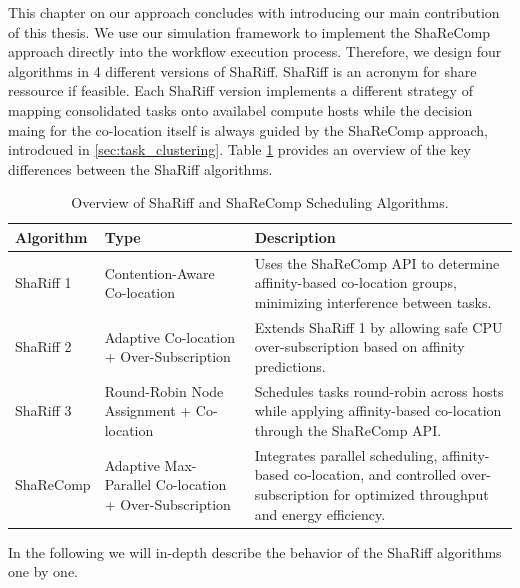 \label{sec:co-location_strategies}

This chapter on our approach concludes with introducing our main contribution of this thesis. We use our simulation framework to implement the ShaReComp approach directly into the workflow execution process. Therefore, we design four algorithms in 4 different versions of ShaRiff. ShaRiff is an acronym for share ressource if feasible. Each ShaRiff version implements a different strategy of mapping consolidated tasks onto availabel compute hosts while the decision maing for the co-location itself is always guided by the ShaReComp approach, introdcued in \ref{sec:task_clustering}.
Table \ref{tab:shariff_overview} provides an overview of the key differences between the ShaRiff algorithms.

\begin{table}[H]
    \centering
    \footnotesize  %
    \begin{tabularx}{\textwidth}{l p{6cm} X}
        \toprule
        \textbf{Algorithm} & \textbf{Type} & \textbf{Description} \\
        \midrule
        ShaRiff 1 & Contention-Aware Co-location & Uses the ShaReComp API to determine affinity-based co-location groups, minimizing interference between tasks. \\
        ShaRiff 2 & Adaptive Co-location + Over-Subscription & Extends ShaRiff 1 by allowing safe CPU over-subscription based on affinity predictions. \\
        ShaRiff 3 & Round-Robin Node Assignment + Co-location & Schedules tasks round-robin across hosts while applying affinity-based co-location through the ShaReComp API. \\
        ShaReComp & Adaptive Max-Parallel Co-location + Over-Subscription & Integrates parallel scheduling, affinity-based co-location, and controlled over-subscription for optimized throughput and energy efficiency. \\
        \bottomrule
    \end{tabularx}
    \small
    \caption{Overview of ShaRiff and ShaReComp Scheduling Algorithms.}
    \label{tab:shariff_overview}
\end{table}


In the following we will in-depth describe the behavior of the ShaRiff algorithms one by one.

